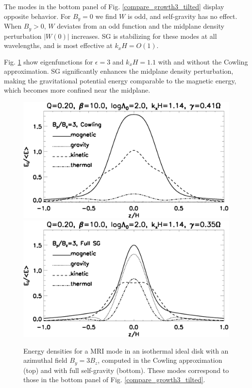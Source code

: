 The modes in the bottom panel of Fig. \ref{compare_growth3_tilted} 
display opposite behavior. For $B_y=0$ we find $W$ is odd, and
self-gravity has no effect. When $B_y>0$, $W$ deviates from an
odd function and the midplane density perturbation $|W(0)|$
increases. SG is stabilizing for these modes at all wavelengths, and
is most effective at $k_xH =  O(1)$.  
     
Fig. \ref{result_tilted} show eigenfunctions for $\epsilon=3$ and
$k_xH=1.1$ with and without the Cowling approximation.
SG significantly enhances the midplane density perturbation, making the
gravitational potential energy comparable to the magnetic energy, 
which becomes more confined near the midplane.  

\begin{figure}
  \includegraphics[width=\linewidth,clip=true,trim=0cm 1.5cm 0cm
    0cm]{figures/result_tilted_cowling.ps}  
  \includegraphics[width=\linewidth,clip=true,trim=0cm 0cm 0cm
    0.cm]{figures/result_tilted_fullsg.ps} 
  \caption{Energy densities for a MRI mode in an isothermal ideal disk
    with an azimuthal field $B_y = 3B_z$, computed in the Cowling
    approximation (top) and with full self-gravity (bottom). These
    modes correspond to those in the bottom panel of
    Fig. \ref{compare_growth3_tilted}.    
    \label{result_tilted}}
\end{figure}


